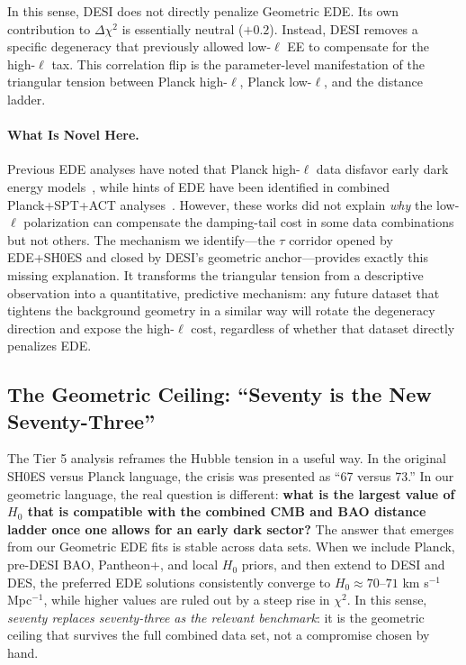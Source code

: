 \documentclass[a4paper,11pt]{article}
\begin{document}
In this sense, DESI does not directly penalize Geometric EDE. Its own contribution to $\Delta\chi^2$ is essentially neutral ($+0.2$). Instead, DESI removes a specific degeneracy that previously allowed low-$\ell$ EE to compensate for the high-$\ell$ tax. This correlation flip is the parameter-level manifestation of the triangular tension between Planck high-$\ell$, Planck low-$\ell$, and the distance ladder.

\paragraph{What Is Novel Here.}
Previous EDE analyses have noted that Planck high-$\ell$ data disfavor early dark energy models~\cite{Hill2020,Ivanov2020}, while hints of EDE have been identified in combined Planck+SPT+ACT analyses~\cite{Schoneberg_hints,Smith2022}. However, these works did not explain \emph{why} the low-$\ell$ polarization can compensate the damping-tail cost in some data combinations but not others. The mechanism we identify---the $\tau$ corridor opened by EDE+SH0ES and closed by DESI's geometric anchor---provides exactly this missing explanation. It transforms the triangular tension from a descriptive observation into a quantitative, predictive mechanism: any future dataset that tightens the background geometry in a similar way will rotate the degeneracy direction and expose the high-$\ell$ cost, regardless of whether that dataset directly penalizes EDE.

\subsection*{The Geometric Ceiling: ``Seventy is the New Seventy-Three''}

The Tier 5 analysis reframes the Hubble tension in a useful way. In the original SH0ES versus Planck language, the crisis was presented as ``67 versus 73.'' In our geometric language, the real question is different: \textbf{what is the largest value of $H_0$ that is compatible with the combined CMB and BAO distance ladder once one allows for an early dark sector?} The answer that emerges from our Geometric EDE fits is stable across data sets. When we include Planck, pre-DESI BAO, Pantheon+, and local $H_0$ priors, and then extend to DESI and DES, the preferred EDE solutions consistently converge to $H_0 \approx 70$--$71$ km s$^{-1}$ Mpc$^{-1}$, while higher values are ruled out by a steep rise in $\chi^2$. In this sense, \emph{seventy replaces seventy-three as the relevant benchmark}: it is the geometric ceiling that survives the full combined data set, not a compromise chosen by hand.
\end{document}
